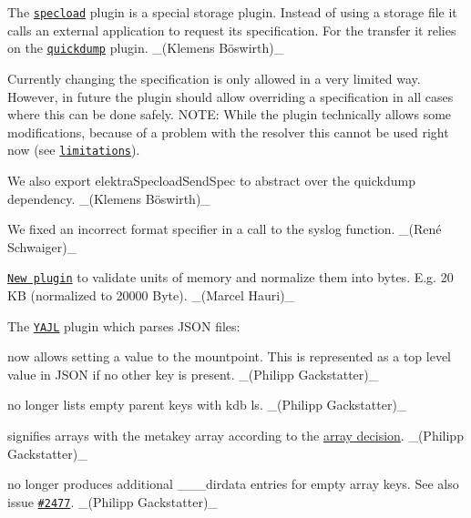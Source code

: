 \begin{DoxyItemize}
\item The \href{https://www.libelektra.org/plugins/specload}{\tt specload} plugin is a special storage plugin. Instead of using a storage file it calls an external application to request its specification. For the transfer it relies on the \href{https://www.libelektra.org/plugins/quickdump}{\tt quickdump} plugin. \+\_\+(Klemens Böswirth)\+\_\+
\item Currently changing the specification is only allowed in a very limited way. However, in future the plugin should allow overriding a specification in all cases where this can be done safely. N\+O\+TE\+: While the plugin technically allows some modifications, because of a problem with the resolver this cannot be used right now (see \href{https://www.libelektra.org/plugins/specload}{\tt limitations}).
\item We also export {\ttfamily elektra\+Specload\+Send\+Spec} to abstract over the {\ttfamily quickdump} dependency. \+\_\+(Klemens Böswirth)\+\_\+
\end{DoxyItemize}


\begin{DoxyItemize}
\item We fixed an incorrect format specifier in a call to the {\ttfamily syslog} function. \+\_\+(René Schwaiger)\+\_\+
\end{DoxyItemize}


\begin{DoxyItemize}
\item \href{https://www.libelektra.org/plugins/unit}{\tt New plugin} to validate units of memory and normalize them into bytes. E.\+g. 20 KB (normalized to 20000 Byte). \+\_\+(\+Marcel Hauri)\+\_\+
\end{DoxyItemize}

The \href{https://www.libelektra.org/plugins/yajl}{\tt Y\+A\+JL} plugin which parses J\+S\+ON files\+:


\begin{DoxyItemize}
\item now allows setting a value to the mountpoint. This is represented as a top level value in J\+S\+ON if no other key is present. \+\_\+(\+Philipp Gackstatter)\+\_\+
\item no longer lists empty parent keys with {\ttfamily kdb ls}. \+\_\+(\+Philipp Gackstatter)\+\_\+
\item signifies arrays with the metakey array according to the \hyperlink{doc_decisions_array_md}{array decision}. \+\_\+(\+Philipp Gackstatter)\+\_\+
\item no longer produces additional {\ttfamily \+\_\+\+\_\+\+\_\+dirdata} entries for empty array keys. See also issue \href{https://github.com/ElektraInitiative/libelektra/issues/2477}{\tt \#2477}. \+\_\+(\+Philipp Gackstatter)\+\_\+
\end{DoxyItemize}


